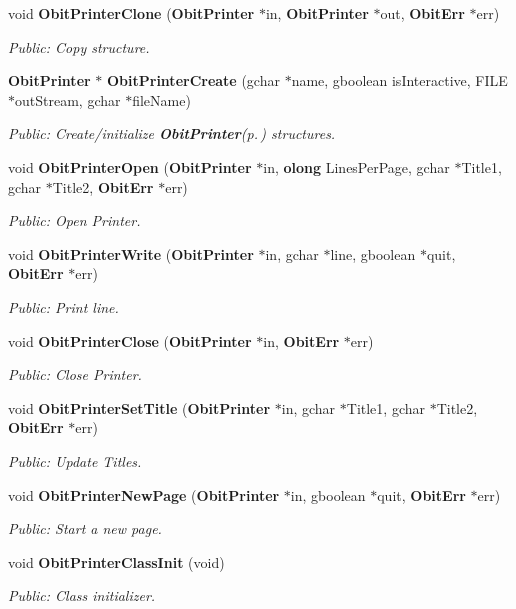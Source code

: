 \begin{CompactItemize}
void {\bf Obit\-Printer\-Clone} ({\bf Obit\-Printer} $\ast$in, {\bf Obit\-Printer} $\ast$out, {\bf Obit\-Err} $\ast$err)
\begin{CompactList}\small\item\em Public: Copy structure. \item\end{CompactList}\item 
{\bf Obit\-Printer} $\ast$ {\bf Obit\-Printer\-Create} (gchar $\ast$name, gboolean is\-Interactive, FILE $\ast$out\-Stream, gchar $\ast$file\-Name)
\begin{CompactList}\small\item\em Public: Create/initialize {\bf Obit\-Printer}{\rm (p.\,\pageref{structObitPrinter})} structures. \item\end{CompactList}\item 
void {\bf Obit\-Printer\-Open} ({\bf Obit\-Printer} $\ast$in, {\bf olong} Lines\-Per\-Page, gchar $\ast$Title1, gchar $\ast$Title2, {\bf Obit\-Err} $\ast$err)
\begin{CompactList}\small\item\em Public: Open Printer. \item\end{CompactList}\item 
void {\bf Obit\-Printer\-Write} ({\bf Obit\-Printer} $\ast$in, gchar $\ast$line, gboolean $\ast$quit, {\bf Obit\-Err} $\ast$err)
\begin{CompactList}\small\item\em Public: Print line. \item\end{CompactList}\item 
void {\bf Obit\-Printer\-Close} ({\bf Obit\-Printer} $\ast$in, {\bf Obit\-Err} $\ast$err)
\begin{CompactList}\small\item\em Public: Close Printer. \item\end{CompactList}\item 
void {\bf Obit\-Printer\-Set\-Title} ({\bf Obit\-Printer} $\ast$in, gchar $\ast$Title1, gchar $\ast$Title2, {\bf Obit\-Err} $\ast$err)
\begin{CompactList}\small\item\em Public: Update Titles. \item\end{CompactList}\item 
void {\bf Obit\-Printer\-New\-Page} ({\bf Obit\-Printer} $\ast$in, gboolean $\ast$quit, {\bf Obit\-Err} $\ast$err)
\begin{CompactList}\small\item\em Public: Start a new page. \item\end{CompactList}\item 
void {\bf Obit\-Printer\-Class\-Init} (void)
\begin{CompactList}\small\item\em Public: Class initializer. \item\end{CompactList}\end{CompactItemize}


